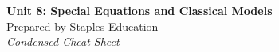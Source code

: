 




\begin{center}
    {\LARGE \bfseries Unit 8: Special Equations and Classical Models}\\[6pt]
    {\large Prepared by Staples Education}\\[4pt]
    {\itshape Condensed Cheat Sheet}
\end{center}

\vspace{0.4em}


